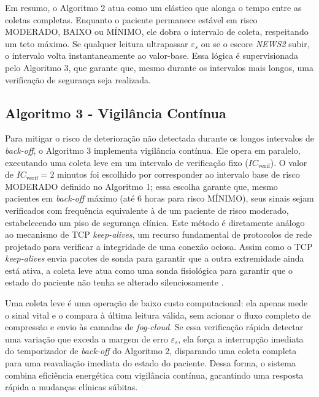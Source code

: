 \documentclass[twoside,english,brazilian]{UNISINOSmonografia}
\begin{document}
Em resumo, o Algoritmo 2 atua como um elástico que alonga o tempo entre as coletas completas. Enquanto o paciente permanece estável em risco MODERADO, BAIXO ou MÍNIMO, ele dobra o intervalo de coleta, respeitando um teto máximo. Se qualquer leitura ultrapassar $\varepsilon_s$ ou se o escore \textit{NEWS2} subir, o intervalo volta instantaneamente ao valor-base. Essa lógica é supervisionada pelo Algoritmo 3, que garante que, mesmo durante os intervalos mais longos, uma verificação de segurança seja realizada.

\subsection{Algoritmo 3 - Vigilância Contínua}
\label{alg3}
Para mitigar o risco de deterioração não detectada durante os longos intervalos de \textit{back-off}, o Algoritmo 3 implementa vigilância contínua. Ele opera em paralelo, executando uma coleta leve em um intervalo de verificação fixo ($IC_{\text{verif}}$). O valor de $IC_{\text{verif}} = 2$ minutos foi escolhido por corresponder ao intervalo base de risco MODERADO definido no Algoritmo 1; essa escolha garante que, mesmo pacientes em \textit{back-off} máximo (até 6 horas para risco MÍNIMO), seus sinais sejam verificados com frequência equivalente à de um paciente de risco moderado, estabelecendo um piso de segurança clínica. Este método é diretamente análogo ao mecanismo de TCP \textit{keep-alives}, um recurso fundamental de protocolos de rede projetado para verificar a integridade de uma conexão ociosa. Assim como o TCP \textit{keep-alives} envia pacotes de sonda para garantir que a outra extremidade ainda está ativa, a coleta leve atua como uma sonda fisiológica para garantir que o estado do paciente não tenha se alterado silenciosamente \cite{RFC1122}.

\begin{algorithm}[!ht]
\setcounter{AlgoLine}{0}
\caption{Vigilância Contínua}
\BlankLine
{}
\end{algorithm}

Uma coleta leve é uma operação de baixo custo computacional: ela apenas mede o sinal vital e o compara à última leitura válida, sem acionar o fluxo completo de compressão e envio às camadas de \textit{fog-cloud}. Se essa verificação rápida detectar uma variação que exceda a margem de erro $\varepsilon_s$, ela força a interrupção imediata do temporizador de \textit{back-off} do Algoritmo 2, disparando uma coleta completa para uma reavaliação imediata do estado do paciente. Dessa forma, o sistema combina eficiência energética com vigilância contínua, garantindo uma resposta rápida a mudanças clínicas súbitas.
\end{document}
